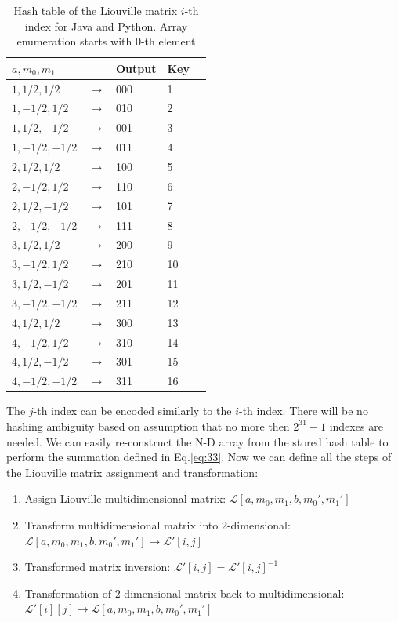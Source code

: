 \begin{table}[h!]
\begin{center}
    \begin{tabular}{  l  l  l  l l }
    \hline
    $a,m_0,m_1$ &  & Output & Key\\ \hline
    $1,1/2,1/2$ & $\rightarrow$ & 000 & 1 \\ \hline
    $1,-1/2,1/2$ & $\rightarrow$ & 010 & 2  \\ \hline
    $1,1/2,-1/2$ & $\rightarrow$ & 001 & 3 \\ \hline
    $1,-1/2,-1/2$ & $\rightarrow$ & 011  & 4\\ \hline
    $2,1/2,1/2$ & $\rightarrow$ & 100 & 5 \\ \hline
    $2,-1/2,1/2$ & $\rightarrow$ & 110 & 6  \\ \hline
    $2,1/2,-1/2$ & $\rightarrow$ & 101 & 7 \\ \hline
    $2,-1/2,-1/2$ & $\rightarrow$ & 111  & 8\\ \hline
    $3,1/2,1/2$ & $\rightarrow$ & 200 & 9 \\ \hline
    $3,-1/2,1/2$ & $\rightarrow$ & 210 & 10  \\ \hline
    $3,1/2,-1/2$ & $\rightarrow$ & 201 & 11 \\ \hline
    $3,-1/2,-1/2$ & $\rightarrow$ & 211  & 12\\ \hline
    $4,1/2,1/2$ & $\rightarrow$ & 300 & 13 \\ \hline
    $4,-1/2,1/2$ & $\rightarrow$ & 310 & 14  \\ \hline
    $4,1/2,-1/2$ & $\rightarrow$ & 301 & 15 \\ \hline
    $4,-1/2,-1/2$ & $\rightarrow$ & 311  & 16\\ \hline
    \end{tabular}
\end{center}
\caption{Hash table of the Liouville matrix $i$-th index for Java and Python. Array enumeration starts with 0-th element}
\label{table:kysymys}
\end{table}
 The $j$-th index can be encoded similarly to the $i$-th index. There will be no hashing ambiguity based on assumption that no more then $2^{31}-1$ indexes are needed. We can easily re-construct the N-D array from the stored hash table to perform the summation defined in Eq.\ref{eq:33}. Now we can define all the steps of the Liouville matrix assignment and transformation:  
\begin{center}
\begin{enumerate}
\item Assign Liouville multidimensional matrix: $\mathcal{L}[a,m_0,m_1,b,m_0',m_1']$
\item Transform multidimensional matrix into 2-dimensional: $\mathcal{L}[a,m_0,m_1,b,m_0',m_1'] \rightarrow \mathcal{L}'[i,j]$ 
\item Transformed matrix inversion: $\mathcal{L}'[i,j]=\mathcal{L}'[i,j]^{-1}$
\item Transformation of 2-dimensional matrix back to multidimensional: \\ $\mathcal{L}'[i][j]\rightarrow \mathcal{L}[a,m_0,m_1,b,m_0',m_1']$ 
\end{enumerate}   
\end{center}    

